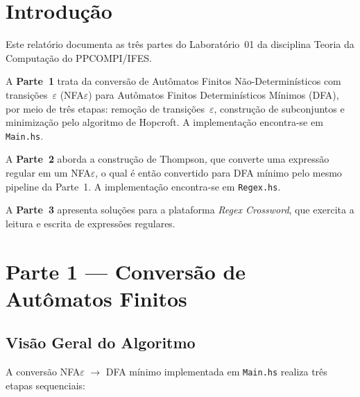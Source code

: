 \documentclass[sumario=abnt-6027-2012]{ifes8}
\begin{document}
\hypersetup{pageanchor=false}

\imprimircapa

\begin{folhaderosto}
  \folhaderostocontent
\end{folhaderosto}

\clearpage
\listoffigures*

\clearpage
{}
\tableofcontents*
\clearpage

\hypersetup{pageanchor=true}
\textual

\chapter{Introdução}

Este relatório documenta as três partes do Laboratório~01 da disciplina
Teoria da Computação do PPCOMPI/IFES.

A \textbf{Parte~1} trata da conversão de Autômatos Finitos Não-Determinísticos
com transições~$\varepsilon$ (NFA$\varepsilon$) para Autômatos Finitos
Determinísticos Mínimos (DFA), por meio de três etapas: remoção de
transições~$\varepsilon$, construção de subconjuntos e minimização pelo
algoritmo de Hopcroft. A implementação encontra-se em \texttt{Main.hs}.

A \textbf{Parte~2} aborda a construção de Thompson, que converte uma
expressão regular em um NFA$\varepsilon$, o qual é então convertido para
DFA mínimo pelo mesmo pipeline da Parte~1. A implementação encontra-se em
\texttt{Regex.hs}.

A \textbf{Parte~3} apresenta soluções para a plataforma \textit{Regex
Crossword}, que exercita a leitura e escrita de expressões regulares.

\chapter{Parte 1 --- Conversão de Autômatos Finitos}

\section{Visão Geral do Algoritmo}

A conversão NFA$\varepsilon$ $\to$ DFA mínimo implementada em
\texttt{Main.hs} realiza três etapas sequenciais:
\end{document}
